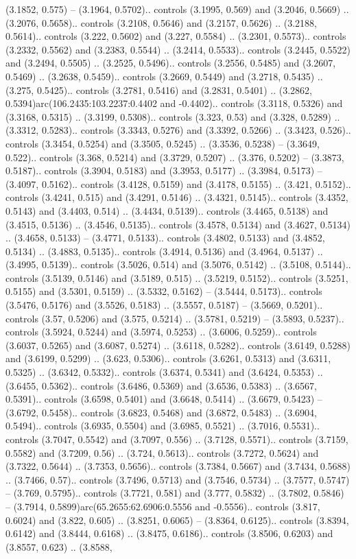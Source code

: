 (3.1852, 0.575) -- (3.1964, 0.5702).. controls (3.1995, 0.569) and (3.2046, 0.5669) .. (3.2076, 0.5658).. controls (3.2108, 0.5646) and (3.2157, 0.5626) .. (3.2188, 0.5614).. controls (3.222, 0.5602) and (3.227, 0.5584) .. (3.2301, 0.5573).. controls (3.2332, 0.5562) and (3.2383, 0.5544) .. (3.2414, 0.5533).. controls (3.2445, 0.5522) and (3.2494, 0.5505) .. (3.2525, 0.5496).. controls (3.2556, 0.5485) and (3.2607, 0.5469) .. (3.2638, 0.5459).. controls (3.2669, 0.5449) and (3.2718, 0.5435) .. (3.275, 0.5425).. controls (3.2781, 0.5416) and (3.2831, 0.5401) .. (3.2862, 0.5394)arc(106.2435:103.2237:0.4402 and -0.4402).. controls (3.3118, 0.5326) and (3.3168, 0.5315) .. (3.3199, 0.5308).. controls (3.323, 0.53) and (3.328, 0.5289) .. (3.3312, 0.5283).. controls (3.3343, 0.5276) and (3.3392, 0.5266) .. (3.3423, 0.526).. controls (3.3454, 0.5254) and (3.3505, 0.5245) .. (3.3536, 0.5238) -- (3.3649, 0.522).. controls (3.368, 0.5214) and (3.3729, 0.5207) .. (3.376, 0.5202) -- (3.3873, 0.5187).. controls (3.3904, 0.5183) and (3.3953, 0.5177) .. (3.3984, 0.5173) -- (3.4097, 0.5162).. controls (3.4128, 0.5159) and (3.4178, 0.5155) .. (3.421, 0.5152).. controls (3.4241, 0.515) and (3.4291, 0.5146) .. (3.4321, 0.5145).. controls (3.4352, 0.5143) and (3.4403, 0.514) .. (3.4434, 0.5139).. controls (3.4465, 0.5138) and (3.4515, 0.5136) .. (3.4546, 0.5135).. controls (3.4578, 0.5134) and (3.4627, 0.5134) .. (3.4658, 0.5133) -- (3.4771, 0.5133).. controls (3.4802, 0.5133) and (3.4852, 0.5134) .. (3.4883, 0.5135).. controls (3.4914, 0.5136) and (3.4964, 0.5137) .. (3.4995, 0.5139).. controls (3.5026, 0.514) and (3.5076, 0.5142) .. (3.5108, 0.5144).. controls (3.5139, 0.5146) and (3.5189, 0.515) .. (3.5219, 0.5152).. controls (3.5251, 0.5155) and (3.5301, 0.5159) .. (3.5332, 0.5162) -- (3.5444, 0.5173).. controls (3.5476, 0.5176) and (3.5526, 0.5183) .. (3.5557, 0.5187) -- (3.5669, 0.5201).. controls (3.57, 0.5206) and (3.575, 0.5214) .. (3.5781, 0.5219) -- (3.5893, 0.5237).. controls (3.5924, 0.5244) and (3.5974, 0.5253) .. (3.6006, 0.5259).. controls (3.6037, 0.5265) and (3.6087, 0.5274) .. (3.6118, 0.5282).. controls (3.6149, 0.5288) and (3.6199, 0.5299) .. (3.623, 0.5306).. controls (3.6261, 0.5313) and (3.6311, 0.5325) .. (3.6342, 0.5332).. controls (3.6374, 0.5341) and (3.6424, 0.5353) .. (3.6455, 0.5362).. controls (3.6486, 0.5369) and (3.6536, 0.5383) .. (3.6567, 0.5391).. controls (3.6598, 0.5401) and (3.6648, 0.5414) .. (3.6679, 0.5423) -- (3.6792, 0.5458).. controls (3.6823, 0.5468) and (3.6872, 0.5483) .. (3.6904, 0.5494).. controls (3.6935, 0.5504) and (3.6985, 0.5521) .. (3.7016, 0.5531).. controls (3.7047, 0.5542) and (3.7097, 0.556) .. (3.7128, 0.5571).. controls (3.7159, 0.5582) and (3.7209, 0.56) .. (3.724, 0.5613).. controls (3.7272, 0.5624) and (3.7322, 0.5644) .. (3.7353, 0.5656).. controls (3.7384, 0.5667) and (3.7434, 0.5688) .. (3.7466, 0.57).. controls (3.7496, 0.5713) and (3.7546, 0.5734) .. (3.7577, 0.5747) -- (3.769, 0.5795).. controls (3.7721, 0.581) and (3.777, 0.5832) .. (3.7802, 0.5846) -- (3.7914, 0.5899)arc(65.2655:62.6906:0.5556 and -0.5556).. controls (3.817, 0.6024) and (3.822, 0.605) .. (3.8251, 0.6065) -- (3.8364, 0.6125).. controls (3.8394, 0.6142) and (3.8444, 0.6168) .. (3.8475, 0.6186).. controls (3.8506, 0.6203) and (3.8557, 0.623) .. (3.8588, 